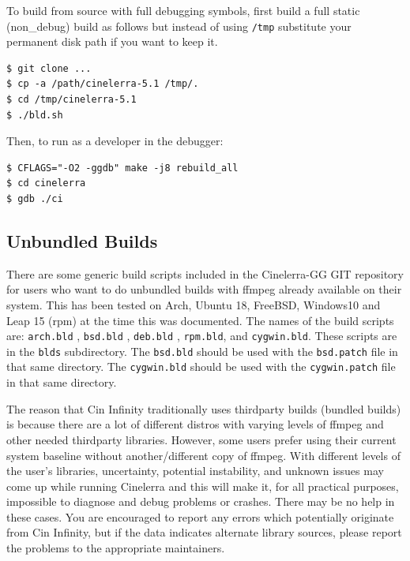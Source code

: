 To build from source with full debugging symbols, first build a full static (non\_debug) build as follows but instead of using \texttt{/tmp} substitute your permanent disk path if you want to keep it.

\begin{lstlisting}[numbers=none]
$ git clone ...
$ cp -a /path/cinelerra-5.1 /tmp/.
$ cd /tmp/cinelerra-5.1
$ ./bld.sh
\end{lstlisting}


Then, to run as a developer in the debugger:

\begin{lstlisting}[numbers=none]
$ CFLAGS="-O2 -ggdb" make -j8 rebuild_all
$ cd cinelerra
$ gdb ./ci
\end{lstlisting}


\subsection{Unbundled Builds}%
\label{sub:unbundled_builds}

There are some generic build scripts included in the Cinelerra-GG GIT repository for users who want to do unbundled builds with ffmpeg already available on their system.  
This has been tested on Arch, Ubuntu 18, FreeBSD, Windows10 and Leap 15 (rpm) at the time this was documented.  
The names of the build scripts are:  \texttt{arch.bld} ,  \texttt{bsd.bld} , \texttt{deb.bld} , \texttt{rpm.bld}, and \texttt{cygwin.bld}.  
These scripts are in the \texttt{blds} subdirectory.  
The \texttt{bsd.bld} should be used with the \texttt{bsd.patch} file in that same directory.
The \texttt{cygwin.bld} should be used with the \texttt{cygwin.patch} file in that same directory.

The reason that Cin Infinity traditionally uses thirdparty builds (bundled builds) is because there are a lot of different distros with varying levels of ffmpeg and other needed thirdparty libraries.  
However, some users prefer using their current system baseline without another/different copy of ffmpeg.  
With different levels of the user’s libraries, uncertainty, potential instability, and unknown issues may come up while running Cinelerra and this will make it, for all practical purposes, impossible to diagnose and debug problems or crashes.  
There may be no help in these cases.  You are encouraged to report any errors which potentially originate from Cin Infinity, but if the data indicates alternate library sources, please report the problems to the appropriate maintainers.

